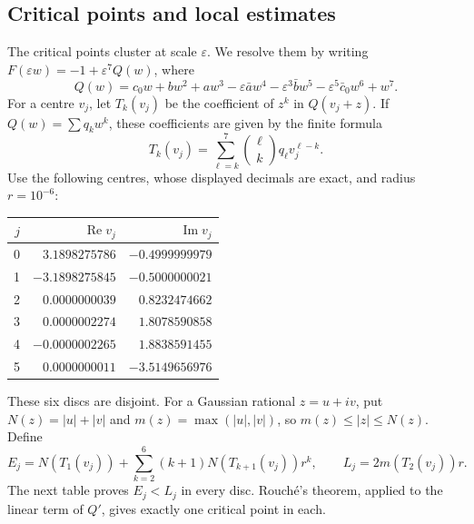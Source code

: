 \documentclass[11pt]{article}
\begin{document}
\subsection{Critical points and local estimates}\label{subsec:counterexample-critical}

The critical points cluster at scale $\varepsilon$. We resolve them by
writing $F(\varepsilon w)=-1+\varepsilon^7 Q(w)$, where
\[
 Q(w)=c_0w+bw^2+aw^3-\varepsilon\bar a w^4
       -\varepsilon^3\bar b w^5-\varepsilon^5\bar c_0 w^6+w^7.
\]
For a centre $v_j$, let $T_k(v_j)$ be the coefficient of $z^k$ in
$Q(v_j+z)$. If $Q(w)=\sum q_kw^k$, these coefficients are given by the
finite formula
\[
 T_k(v_j)=\sum_{\ell=k}^7{\ell\choose k}q_\ell v_j^{\ell-k}.
\]
Use the following centres, whose displayed decimals are exact, and radius
$r=10^{-6}$:
\begin{center}\small
\begin{tabular}{@{}rrr@{}}
\toprule
$j$&$\operatorname{Re}v_j$&$\operatorname{Im}v_j$\\
\midrule
0&$3.1898275786$&$-0.4999999979$\\
1&$-3.1898275845$&$-0.5000000021$\\
2&$0.0000000039$&$0.8232474662$\\
3&$0.0000002274$&$1.8078590858$\\
4&$-0.0000002265$&$1.8838591455$\\
5&$0.0000000011$&$-3.5149656976$\\
\bottomrule
\end{tabular}
\end{center}
These six discs are disjoint. For a Gaussian rational $z=u+iv$, put
$N(z)=|u|+|v|$ and $m(z)=\max(|u|,|v|)$, so
$m(z)\le|z|\le N(z)$. Define
\[
 E_j=N(T_1(v_j))+\sum_{k=2}^{6}(k+1)N(T_{k+1}(v_j))r^k,
 \qquad L_j=2m(T_2(v_j))r.
\]
The next table proves $E_j<L_j$ in every disc. Rouch\'e's theorem, applied
to the linear term of $Q'$, gives exactly one critical point in each.
\end{document}
